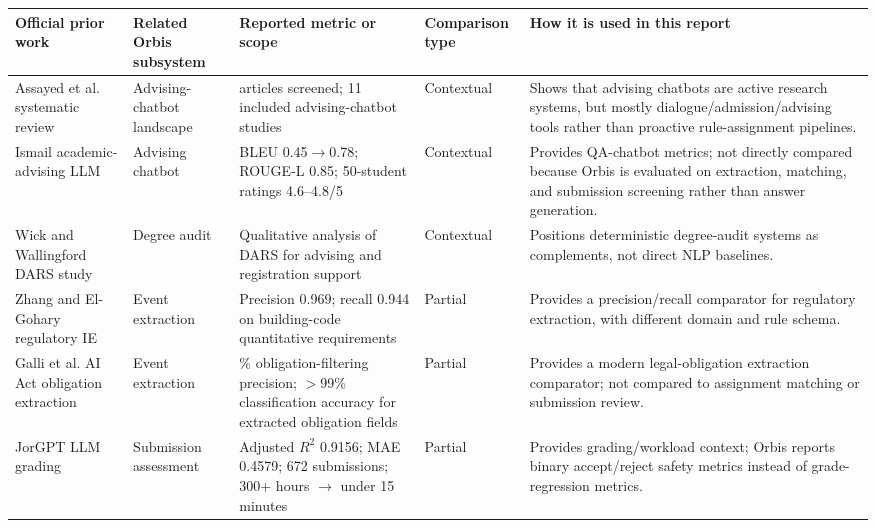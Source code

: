 \documentclass[a4paper,12pt]{article}
\begin{document}
\begin{table}[H]
\centering
\scriptsize
\begin{adjustbox}{width=\textwidth}
\begin{tabular}{>{\raggedright\arraybackslash}p{3.2cm}>{\raggedright\arraybackslash}p{2.5cm}>{\raggedright\arraybackslash}p{3.4cm}>{\raggedright\arraybackslash}p{2.2cm}>{\raggedright\arraybackslash}p{4.7cm}}
\toprule
\textbf{Official prior work} & \textbf{Related Orbis subsystem} & \textbf{Reported metric or scope} & \textbf{Comparison type} & \textbf{How it is used in this report} \\ \midrule
Assayed et al. systematic review \cite{assayed2024systematic} & Advising-chatbot landscape & 128 articles screened; 11 included advising-chatbot studies & Contextual & Shows that advising chatbots are active research systems, but mostly dialogue/admission/advising tools rather than proactive rule-assignment pipelines. \\
Ismail academic-advising LLM \cite{ismail2025academic} & Advising chatbot & BLEU 0.45$\rightarrow$0.78; ROUGE-L 0.85; 50-student ratings 4.6--4.8/5 & Contextual & Provides QA-chatbot metrics; not directly compared because Orbis is evaluated on extraction, matching, and submission screening rather than answer generation. \\
Wick and Wallingford DARS study \cite{wick2023dars} & Degree audit & Qualitative analysis of DARS for advising and registration support & Contextual & Positions deterministic degree-audit systems as complements, not direct NLP baselines. \\
Zhang and El-Gohary regulatory IE \cite{zhang2016semantic} & Event extraction & Precision 0.969; recall 0.944 on building-code quantitative requirements & Partial & Provides a precision/recall comparator for regulatory extraction, with different domain and rule schema. \\
Galli et al. AI Act obligation extraction \cite{galli2025aiAct} & Event extraction & 93\% obligation-filtering precision; $>$99\% classification accuracy for extracted obligation fields & Partial & Provides a modern legal-obligation extraction comparator; not compared to assignment matching or submission review. \\
JorGPT LLM grading \cite{cisneros2025jorgpt} & Submission assessment & Adjusted $R^2$ 0.9156; MAE 0.4579; 672 submissions; 300+ hours $\rightarrow$ under 15 minutes & Partial & Provides grading/workload context; Orbis reports binary accept/reject safety metrics instead of grade-regression metrics. \\

\end{tabular}
\end{adjustbox}
\end{table}
\end{document}
